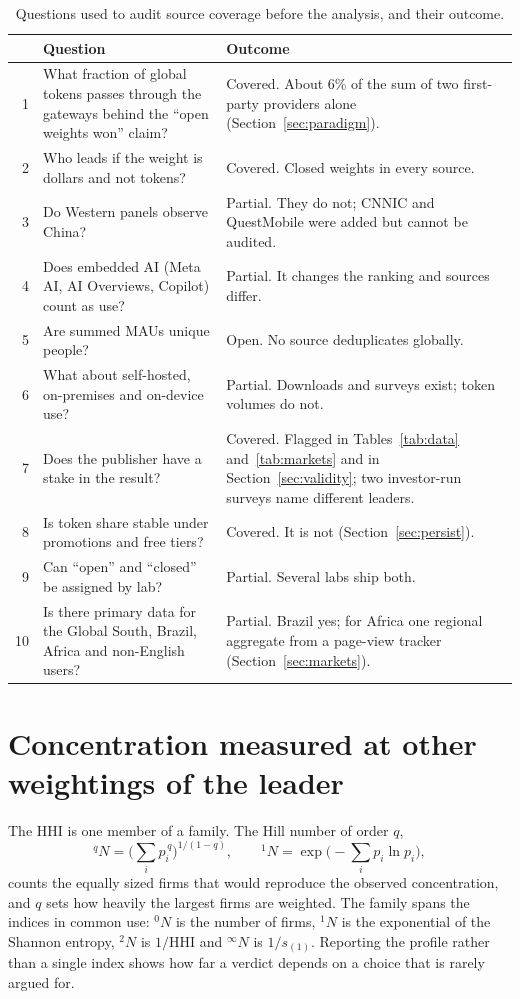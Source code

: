 \documentclass[11pt]{article}
\begin{document}
\begin{table}[H]
\centering\footnotesize
\caption{Questions used to audit source coverage before the analysis, and their outcome.}
\begin{tabularx}{\textwidth}{@{}r L{6.1cm} X@{}}
\toprule
& Question & Outcome \\
 & What fraction of global tokens passes through the gateways behind the ``open weights won'' claim? & Covered. About 6\% of the sum of two first-party providers alone (Section~\ref{sec:paradigm}). \\
2 & Who leads if the weight is dollars and not tokens? & Covered. Closed weights in every source. \\
3 & Do Western panels observe China? & Partial. They do not; CNNIC and QuestMobile were added but cannot be audited. \\
4 & Does embedded AI (Meta AI, AI Overviews, Copilot) count as use? & Partial. It changes the ranking and sources differ. \\
5 & Are summed MAUs unique people? & Open. No source deduplicates globally. \\
6 & What about self-hosted, on-premises and on-device use? & Partial. Downloads and surveys exist; token volumes do not. \\
7 & Does the publisher have a stake in the result? & Covered. Flagged in Tables~\ref{tab:data} and~\ref{tab:markets} and in Section~\ref{sec:validity}; two investor-run surveys name different leaders. \\
8 & Is token share stable under promotions and free tiers? & Covered. It is not (Section~\ref{sec:persist}). \\
9 & Can ``open'' and ``closed'' be assigned by lab? & Partial. Several labs ship both. \\
10 & Is there primary data for the Global South, Brazil, Africa and non-English users? & Partial. Brazil yes; for Africa one regional aggregate from a page-view tracker (Section~\ref{sec:markets}). \\
\bottomrule
\end{tabularx}
\end{table}

\section{Concentration measured at other weightings of the leader}
\label{app:hill}

The HHI is one member of a family. The Hill number of order $q$,
\[
{}^{q}N=\Big(\textstyle\sum_i p_i^{\,q}\Big)^{1/(1-q)},\qquad
{}^{1}N=\exp\!\Big(-\textstyle\sum_i p_i\ln p_i\Big),
\]
counts the equally sized firms that would reproduce the observed concentration, and $q$ sets how heavily the largest firms are weighted. The family spans the indices in common use: ${}^{0}N$ is the number of firms, ${}^{1}N$ is the exponential of the Shannon entropy, ${}^{2}N$ is $1/\mathrm{HHI}$ and ${}^{\infty}N$ is $1/s_{(1)}$. Reporting the profile rather than a single index shows how far a verdict depends on a choice that is rarely argued for.
\end{document}
